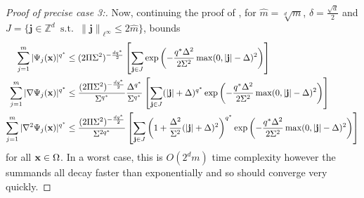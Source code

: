 \documentclass[10pt,a4paper,onecolumn]{article}
\numberwithin{equation}{section}
\let\F\mathds\let\C\mathcal\newcommand{\R}{\F{R}}\newcommand{\A}{\C{A}}
\newcommand{\norm}[1]{{\left\lVert #1 \right\rVert}}
\DeclareMathOperator{\st}{\;s.t.\;}\DeclareMathOperator{\as}{\;a.s.\;}\renewcommand{\epsilon}{\varepsilon}
\renewcommand{\vec}{\mathbf}
\newcommand{\UCmath}[1]{%
	\begingroup
	\ucmathlist\uppercase\expandafter{#1}%
	\endgroup
}
\newcommand{\ucmathlist}{%
	\def\alpha{\mathrm{A}}%
	\def\beta{\mathrm{B}}%
	\let\gamma=\Gamma
	\let\delta=\Delta
	\def\epsilon{\mathrm{E}}%
	\def\varepsilon{\mathrm{E}}%
	\def\zeta{\mathrm{Z}}%
	\def\eta{\mathrm{H}}%
	\let\theta=\Theta
	\let\vartheta=\Theta
	\def\iota{\mathrm{I}}%
	\def\kappa{\mathrm{K}}%
	\let\lambda=\Lambda
	\def\mu{\mathrm{M}}%
	\def\nu{\mathrm{N}}%
	\let\xi=\Xi
	\let\pi=\Pi
	\let\varpi=\Pi
	\def\rho{\mathrm{P}}%
	\def\varrho{\mathrm{P}}%
	\let\sigma=\Sigma
	\def\tau{\mathrm{T}}%
	\let\upsilon=\Upsilon
	\let\phi=\Phi
	\let\varphi=\Phi
	\def\chi{\mathrm{X}}%
	\let\psi=\Psi
	\let\omega=\Omega
}
\newcommand{\caps}[1]{\UCmath{#1}}
\newcommand*{\vard}[1]{%
	\IfEqCase{#1}{%
		{0}{\varphi}%
		{1}{\psi}%
	}[\varphi #1]%
}
\newcommand*{\varx}[1]{%
	\IfEqCase{#1}{%
		{0}{x}%
		{1}{y}%
		{2}{z}%
		{3}{r}%
	}[x#1]%
}
\newcommand{\Domain}{\Omega}
\newcommand*{\Varx}[1]{\caps{\varx{#1}}}
\newcommand*{\vvarx}[1]{\vec{\varx{#1}}}\newcommand*{\vVarx}[1]{\vec{\Varx{#1}}}
\begin{document}
\begin{proof}[Proof of precise case 3:]
	Now, continuing the proof of , for $\hat m=\sqrt[d]{m}$, $\delta=\frac{\sqrt{d}}{2}$ and $J=\{\vec{j}\in\F Z^d \st \norm{\vec{j}}_{\ell^\infty}\leq 2\hat m\}$,  bounds 
	\begin{align*}
		\sum_{j=1}^m |\vard1_j(\vvarx0)|^{q^*} &\leq (2\pi\sigma^2)^{-\frac{dq^*}{2}} \left[\sum_{\vec{j}\in J} \exp\left(-\frac{q^*\Delta^2}{2\sigma^2}\max(0,|\vec{j}|-\delta)^2\right)\right]
		\\\sum_{j=1}^m |\nabla\vard1_j(\vvarx0)|^{q^*} &\leq \frac{(2\pi\sigma^2)^{-\frac{dq^*}{2}}}{\sigma^{q^*}}\frac{\Delta^{q^*}}{\sigma^{q^*}} \left[\sum_{\vec{j}\in J} (|\vec{j}|+\delta)^{q^*}\exp\left(-\frac{q^*\Delta^2}{2\sigma^2}\max(0,|\vec{j}|-\delta)^2\right)\right]
		\\\sum_{j=1}^m |\nabla^2\vard1_j(\vvarx0)|^{q^*} &\leq \frac{(2\pi\sigma^2)^{-\frac{dq^*}{2}}}{\sigma^{2q^*}} \left[\sum_{\vec{j}\in J} \left(1+\frac{\Delta^2}{\sigma^2}(|\vec{j}|+\delta)^2\right)^{q^*}\exp\left(-\frac{q^*\Delta^2}{2\sigma^2}\max(0,|\vec{j}|-\delta)^2\right)\right]
	\end{align*}
	for all $\vvarx0\in\Domain$. In a worst case, this is $O(2^dm)$ time complexity however the summands all decay faster than exponentially and so should converge very quickly.	
\end{proof}
\end{document}
